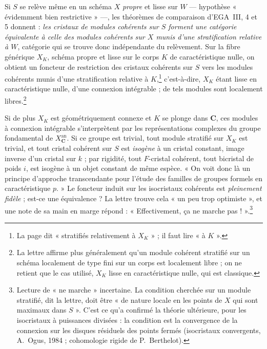 \documentclass[11pt,a4paper]{article}
\begin{document}
Si $S$ se relève même en un schéma $X$ \emph{propre} et lisse sur $W$ —
hypothèse « évidemment bien restrictive » —, les théorèmes de comparaison
d'EGA~III, 4 et 5 donnent : \emph{les cristaux de modules cohérents sur $S$
forment une catégorie équivalente à celle des modules cohérents sur $X$ munis
d'une stratification relative à $W$}, catégorie qui se trouve donc
indépendante du relèvement. Sur la fibre générique $X_K$, schéma propre et
lisse sur le corps $K$ de caractéristique nulle, on obtient un foncteur de
restriction des cristaux cohérents sur $S$ vers les modules cohérents munis
d'une stratification relative à $K$,\footnote{La page dit « stratifiés
relativement à $X_K$ » ; il faut lire « à $K$ ».} c'est-à-dire, $X_K$ étant
lisse en caractéristique nulle, d'une connexion intégrable ; de tels modules
sont localement libres.\footnote{La lettre affirme plus généralement qu'un
module cohérent stratifié sur un schéma localement de type fini sur un corps
est localement libre ; on ne retient que le cas utilisé, $X_K$ lisse en
caractéristique nulle, qui est classique.}

Si de plus $X_K$ est géométriquement connexe et $K$ se plonge dans
$\mathbf{C}$, ces modules à connexion intégrable s'interprètent par les
représentations complexes du groupe fondamental de $X_{\mathbf{C}}^{\mathrm{an}}$.
Si ce groupe est trivial, tout module stratifié sur $X_K$ est trivial, et tout
cristal cohérent sur $S$ est \emph{isogène} à un cristal constant, image
inverse d'un cristal sur $k$ ; par rigidité, tout $F$-cristal cohérent, tout
bicristal de poids $i$, est isogène à un objet constant de même espèce. « On
voit donc là un principe d'approche transcendante pour l'étude des familles de
groupes formels en caractéristique $p$. » Le foncteur induit sur les
isocristaux cohérents est \emph{pleinement fidèle} ; est-ce une équivalence ?
La lettre trouve cela « un peu trop optimiste », et une note de sa main en
marge répond : « Effectivement, ça ne marche pas ! ».\footnote{Lecture de « ne
marche » incertaine. La condition cherchée sur un module stratifié, dit la
lettre, doit être « de nature locale en les points de $X$ qui sont maximaux
dans $S$ ». C'est ce qu'a confirmé la théorie ultérieure, pour les
isocristaux à puissances divisées : la condition est la convergence de la
connexion sur les disques résiduels des points fermés (isocristaux
convergents, A.~Ogus, 1984 ; cohomologie rigide de P.~Berthelot).}
\end{document}
